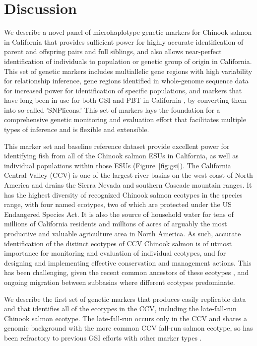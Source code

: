 \section*{Discussion}

We describe a novel panel of microhaplotype genetic markers for Chinook salmon
in California that provides sufficient power for highly accurate identification 
of parent and offspring pairs and full siblings, and also allows near-perfect
identification of individuals to population or genetic group of origin in California. 
This set of genetic markers includes multiallelic gene regions with high variability for
relationship inference, gene regions identified in whole-genome sequence data
for increased power for identification of specific populations, and markers that have
long been in use for both GSI and PBT in California \citep{clemento2014evaluation}, by converting them
into so-called 'SNPlicons.' This set of markers lays the foundation for a comprehensive 
genetic monitoring and evaluation effort that facilitates multiple types of inference 
and is flexible and extensible.


This marker set and baseline reference dataset provide
excellent power for identifying fish from all of the Chinook salmon ESUs in California,
as well as individual populations within those ESUs (Figure~\ref{fig:gsi}).
The California Central Valley (CCV) is one of the largest river
basins on the west coast of North America and drains the Sierra Nevada and southern Cascade
mountain ranges. It has the highest diversity of recognized Chinook salmon
ecotypes in the species range, with four named ecotypes, two of which are protected
under the US Endangered Species Act. It is also the source of household water for
tens of millions of California residents and millions of acres of arguably
the most productive and valuable agriculture area in North America. As such, accurate identification of the distinct 
ecotypes of CCV Chinook salmon is of utmost importance for monitoring and
evaluation of individual ecotypes, and for designing and implementing
effective conservation and management actions. This has been challenging,
given the recent common ancestors of these ecotypes \citep{clemento2014evaluation}, and
ongoing migration between subbasins where different ecotypes predominate.

We describe the first set of genetic markers that produces easily replicable data and
that identifies all of the ecotypes in the CCV, including the late-fall-run Chinook salmon ecotype.
The late-fall-run occurs only in the CCV and shares a genomic background with the more
common CCV fall-run salmon ecotype, so has been refractory to previous GSI efforts with other marker types \citep{seeb2007development,clemento2014evaluation,meek2016sequencing,thompson2024genomics}. 


